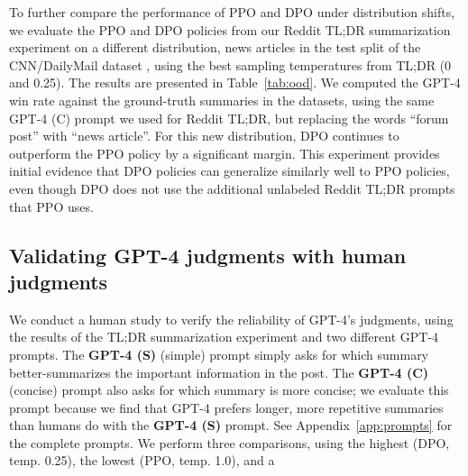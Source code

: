 To further compare the performance of PPO and DPO under distribution shifts, we evaluate the PPO and DPO policies from our Reddit TL;DR summarization experiment on a different distribution, news articles in the test split of the CNN/DailyMail dataset \citep{nallapati-etal-2016-abstractive}, using the best sampling temperatures from TL;DR (0 and 0.25). The results are presented in Table~\ref{tab:ood}. We computed the GPT-4 win rate against the ground-truth summaries in the datasets, using the same GPT-4 (C) prompt we used for Reddit TL;DR, but replacing the words ``forum post'' with ``news article''. For this new distribution, DPO continues to outperform the PPO policy by a significant margin. This experiment provides initial evidence that DPO policies can generalize similarly well to PPO policies, even though DPO does not use the additional unlabeled Reddit TL;DR prompts that PPO uses.

\subsection{Validating GPT-4 judgments with human judgments}
\label{sec:human-judgments}
We conduct a human study to verify the reliability of GPT-4's judgments, using the results of the TL;DR summarization experiment and two different GPT-4 prompts. The \textbf{GPT-4 (S)} (simple) prompt simply asks for which summary better-summarizes the important information in the post. The \textbf{GPT-4 (C)} (concise) prompt also asks for which summary is more concise; we evaluate this prompt because we find that GPT-4 prefers longer, more repetitive summaries than humans do with the \textbf{GPT-4 (S)} prompt. See Appendix~\ref{app:prompts} for the complete prompts. We perform three comparisons, using the highest (DPO, temp. 0.25), the lowest (PPO, temp. 1.0), and a

